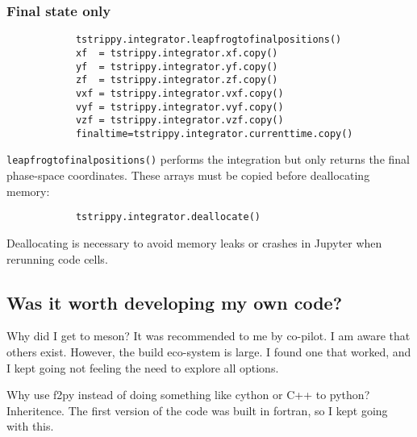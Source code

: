 \documentclass{article}
\begin{document}
        \subsubsection*{Final state only}
        \small
        \begin{lstlisting}
            tstrippy.integrator.leapfrogtofinalpositions()
            xf  = tstrippy.integrator.xf.copy()
            yf  = tstrippy.integrator.yf.copy()
            zf  = tstrippy.integrator.zf.copy()
            vxf = tstrippy.integrator.vxf.copy()
            vyf = tstrippy.integrator.vyf.copy()
            vzf = tstrippy.integrator.vzf.copy()
            finaltime=tstrippy.integrator.currenttime.copy()
        \end{lstlisting}
        \normalsize
        \texttt{leapfrogtofinalpositions()} performs the integration but only returns the final phase-space coordinates. These arrays must be copied before deallocating memory:
        \small
        \begin{lstlisting}
            tstrippy.integrator.deallocate()
        \end{lstlisting}
        \normalsize
        Deallocating is necessary to avoid memory leaks or crashes in Jupyter when rerunning code cells.

    \subsection{Was it worth developing my own code?}
    Why did I get to meson? It was recommended to me by co-pilot. I am aware that others exist. However, the build eco-system is large. I found one that worked, and I kept going not feeling the need to explore all options. 

    Why use f2py instead of doing something like cython or C++ to python? Inheritence. The first version of the code was built in fortran, so I kept going with this. 
\end{document}
